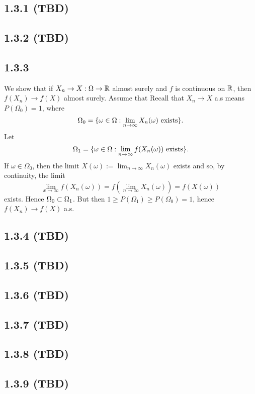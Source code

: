 \documentclass[11pt]{article}
\begin{document}
\subsection*{1.3.1 (TBD)}

\subsection*{1.3.2 (TBD)}

\subsection*{1.3.3}

We show that if $X_n \to X : \Omega \to {\mathbb R}$ almost surely and $f$ is continuous on ${\mathbb R}$, then $f(X_n) \to f(X)$ almost surely. Assume that Recall that $X_n \to X$ a.s means $P(\Omega_0) = 1$, where \[\Omega_0 = \{\omega \in \Omega: \lim_{n\to \infty} X_n(\omega) \text{ exists}\}.\] Let \[\Omega_1 =  \{\omega \in \Omega: \lim_{n\to \infty} f(X_n(\omega)) \text{ exists}\}.\] If $\omega \in \Omega_0$, then the limit $X(\omega) := \lim_{n\to \infty} X_n(\omega)$ exists and so, by continuity, the limit \[\lim_{x\to \infty } f(X_n(\omega)) = f(\lim_{n\to \infty} X_n(\omega)) = f(X(\omega))\] exists. Hence $\Omega_0 \subset \Omega_1$. But then $1 \geq P(\Omega_1) \geq P(\Omega_0) = 1$, hence $f(X_n) \to f(X)$ a.s.

\subsection*{1.3.4 (TBD)}

\subsection*{1.3.5 (TBD)}

\subsection*{1.3.6 (TBD)}

\subsection*{1.3.7 (TBD)}

\subsection*{1.3.8 (TBD)} 

\subsection*{1.3.9 (TBD)}
\end{document}
